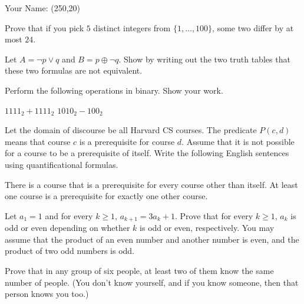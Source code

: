 \documentclass[solution, letterpaper]{cs20exam}
\newcommand{\namebox}{\framebox(250,20){}}
\begin{document}

\vspace{-1.8in}\hbox{}\hspace{2in}Your Name: \namebox
\vspace{1.2in}

\problem{}{} Prove that if you pick $5$ distinct integers from $\{1, \ldots, 100\}$, some two differ by at most $24$.

\begin{solution}
\end{solution}

\pagebreak

\problem{}{} Let $A = \neg p \lor q$ and $B = p \oplus \neg q$. Show by writing out the two truth tables that these two formulas are not equivalent.

\begin{solution}
\end{solution}

\pagebreak

\problem{}{} Perform the following operations in binary. Show your work.

\subproblem $1111_2 + 1111_2$
\subproblem $1010_2 - 100_2$

\begin{solution}
\end{solution}

\pagebreak

\problem{}{} Let the domain of discourse be all Harvard CS courses. The predicate $P(c, d)$ means that course $c$ is a prerequisite for course $d$. Assume that it is not possible for a course to be a prerequisite of itself. Write the following English sentences using quantificational formulas.

\subproblem There is a course that is a prerequisite for every course other than itself.
\subproblem At least one course is a prerequisite for exactly one other course.

\begin{solution}
\end{solution}

\pagebreak

\problem{}{}
Let $a_1=1$ and for every $k \geq 1$, $a_{k+1}=3a_k+1$. Prove that for every $k \geq1 $, $a_k$ is odd or even depending on whether $k$ is odd or even, respectively. You may assume that the product of an even number and another number is even, and the product of two odd numbers is odd.

\begin{solution}
\end{solution}

\pagebreak

\problem{}{}
Prove that in any group of six people, at least two of them know the same number of people. (You don't know yourself, and if you know someone, then that person knows you too.)

\begin{solution}
\end{solution}
\end{document}
